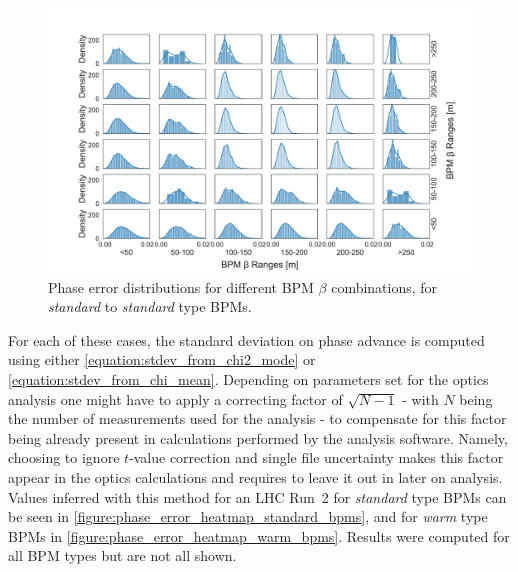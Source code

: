 \begin{figure}[!htb]
    \centering
    \includegraphics*[width=\textwidth]{Figures/Other_Studies/phase_grid_distributions_errors_standard_standard.pdf}
    \caption{Phase error distributions for different BPM \(\beta\) combinations, for \textit{standard} to \textit{standard} type BPMs.}
    \label{figure:grid_distributions_standard_standard}
\end{figure}

For each of these cases, the standard deviation on phase advance is computed using either \cref{equation:stdev_from_chi2_mode} or \cref{equation:stdev_from_chi_mean}.
Depending on parameters set for the optics analysis one might have to apply a correcting factor of \(\sqrt{N-1}\) - with \(N\) being the number of measurements used for the analysis - to compensate for this factor being already present in calculations performed by the analysis software.
Namely, choosing to ignore \(t\)-value correction and single file uncertainty makes this factor appear in the optics calculations and requires to leave it out in later on analysis.
Values inferred with this method for an LHC Run~\num{2} for \textit{standard} type BPMs can be seen in \cref{figure:phase_error_heatmap_standard_bpms}, and for \textit{warm} type BPMs in \cref{figure:phase_error_heatmap_warm_bpms}.
Results were computed for all BPM types but are not all shown.

